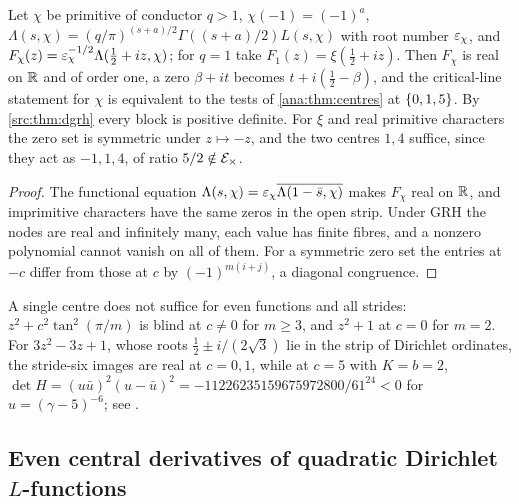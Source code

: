 \begin{corollary}\label{ana:cor:hankel}
Let $\chi$ be primitive of conductor $q>1$, $\chi(-1)=(-1)^a$,
$\Lambda(s,\chi)=(q/\pi)^{(s+a)/2}\Gamma((s+a)/2)L(s,\chi)$ with root number $\varepsilon_\chi$, and
$F_\chi(z)=\varepsilon_\chi^{-1/2}\Lambda(\frac12+iz,\chi)$; for $q=1$ take $F_1(z)=\xi(\frac12+iz)$.
Then $F_\chi$ is real on $\mathbb{R}$ and of order one, a zero $\beta+it$ becomes $t+i(\frac12-\beta)$,
and the critical-line statement for $\chi$ is equivalent to the tests of
\cref{ana:thm:centres} at $\{0,1,5\}$. By \cref{src:thm:dgrh} every block is positive
definite. For $\xi$ and real primitive characters the zero set is symmetric under $z\mapsto-z$,
and the two centres $1,4$ suffice, since they act as $-1,1,4$, of ratio $5/2\notin\mathcal{E}_\times$.
\end{corollary}

\begin{proof}
The functional equation $\Lambda(s,\chi)=\varepsilon_\chi\overline{\Lambda(1-\bar s,\chi)}$ makes
$F_\chi$ real on $\mathbb{R}$, and imprimitive characters have the same zeros in the open strip. Under
GRH the nodes are real and infinitely many, each value has finite fibres, and a nonzero
polynomial cannot vanish on all of them. For a symmetric zero set the entries at $-c$ differ
from those at $c$ by $(-1)^{m(i+j)}$, a diagonal congruence.
\end{proof}

A single centre does not suffice for even functions and all strides: $z^2+c^2\tan^2(\pi/m)$ is
blind at $c\ne0$ for $m\ge3$, and $z^2+1$ at $c=0$ for $m=2$. For $3z^2-3z+1$, whose roots
$\frac12\pm i/(2\sqrt3)$ lie in the strip of Dirichlet ordinates, the stride-six images are
real at $c=0,1$, while at $c=5$ with $K=b=2$,
$\det H=(u\bar u)^2(u-\bar u)^2=-11226235159675972800/61^{24}<0$ for $u=(\gamma-5)^{-6}$; see
.

\subsection{Even central derivatives of quadratic Dirichlet \texorpdfstring{$L$}{L}-functions}\label{li:sec:central}

